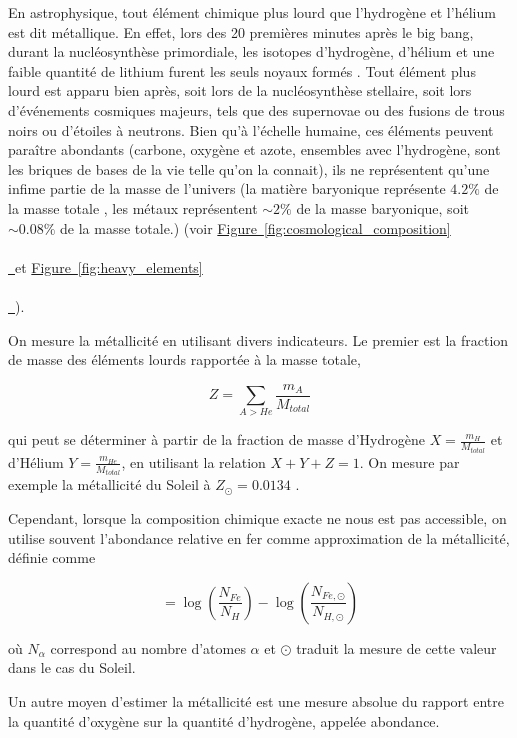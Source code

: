 \documentclass[12pt, a4paper]{article}
\newcommand*{\figref}[2][]{%
  \hyperref[{#2}]{%
    Figure~\ref*{#2}%
    \ifx\\#1\\%
    \else
      \,#1%
    \fi
  }%
}
\begin{document}
En astrophysique, tout élément chimique plus lourd que l'hydrogène et l'hélium est dit métallique. En effet, lors des 20 premières minutes après le big bang, durant la nucléosynthèse primordiale, les isotopes d'hydrogène, d'hélium et une faible quantité de lithium furent les seuls noyaux formés \parencite{2017IJMPE..2641002C}. Tout élément plus lourd est apparu bien après, soit lors de la nucléosynthèse stellaire, soit lors d'événements cosmiques majeurs, tels que des supernovae ou des fusions de trous noirs ou d'étoiles à neutrons. Bien qu'à l'échelle humaine, ces éléments peuvent paraître abondants (carbone, oxygène et azote, ensembles avec l'hydrogène, sont les briques de bases de la vie telle qu'on la connait), ils ne représentent qu'une infime partie de la masse de l'univers (la matière baryonique représente $4.2 \%$ de la masse totale \parencite{2024JCAP...06..006S}, les métaux représentent $\sim 2\%$ de la masse baryonique, soit $\sim 0.08\%$ de la masse totale.) (voir \figref{fig:cosmological_composition} et \figref{fig:heavy_elements}).

On mesure la métallicité en utilisant divers indicateurs. Le premier est la fraction de masse des éléments lourds rapportée à la masse totale,

\begin{equation}
  Z = \sum_{A > He} \frac{m_A}{M_{total}}
\end{equation}

qui peut se déterminer à partir de la fraction de masse d'Hydrogène $X = \frac{m_H}{M_{total}}$ et d'Hélium $Y = \frac{m_{He}}{M_{total}}$, en utilisant la relation $X + Y + Z = 1$. On mesure par exemple la métallicité du Soleil à $Z_\odot = 0.0134$ \parencite{2009ARA&A..47..481A}.

Cependant, lorsque la composition chimique exacte ne nous est pas accessible, on utilise souvent l'abondance relative en fer comme approximation de la métallicité, définie comme 

\begin{equation}
  [Fe/H] = \log(\frac{N_{Fe}}{N_H}) - \log(\frac{N_{Fe, \odot}}{N_{H, \odot}})
\end{equation}

où $N_\alpha$ correspond au nombre d'atomes $\alpha$ et $\odot$ traduit la mesure de cette valeur dans le cas du Soleil.

Un autre moyen d'estimer la métallicité est une mesure absolue du rapport entre la quantité d'oxygène sur la quantité d'hydrogène, appelée abondance.
\end{document}

